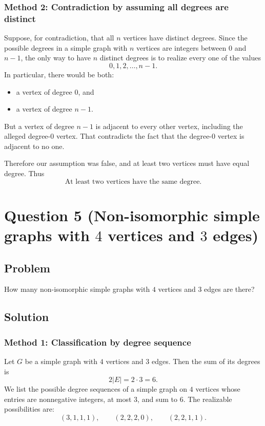 \documentclass[12pt]{article}
\begin{document}
\subsubsection{Method 2: Contradiction by assuming all degrees are distinct}
Suppose, for contradiction, that all \(n\) vertices have distinct degrees. Since the possible degrees in a simple graph with \(n\) vertices are integers between \(0\) and \(n-1\), the only way to have \(n\) distinct degrees is to realize every one of the values
\[
0,1,2,\dots,n-1.
\]
In particular, there would be both:
\begin{itemize}[leftmargin=*]
  \item a vertex of degree \(0\), and
  \item a vertex of degree \(n-1\).
\end{itemize}
But a vertex of degree \(n-1\) is adjacent to every other vertex, including the alleged degree-\(0\) vertex. That contradicts the fact that the degree-\(0\) vertex is adjacent to no one.

Therefore our assumption was false, and at least two vertices must have equal degree. Thus
\[
\boxed{\text{At least two vertices have the same degree.}}
\]

\newpage

\section{Question 5 (Non-isomorphic simple graphs with \(4\) vertices and \(3\) edges)}

\subsection{Problem}
How many non-isomorphic simple graphs with \(4\) vertices and \(3\) edges are there?

\subsection{Solution}

\subsubsection{Method 1: Classification by degree sequence}
Let \(G\) be a simple graph with \(4\) vertices and \(3\) edges. Then the sum of its degrees is
\[
2|E|=2\cdot 3=6.
\]
We list the possible degree sequences of a simple graph on \(4\) vertices whose entries are nonnegative integers, at most \(3\), and sum to \(6\). The realizable possibilities are:
\[
(3,1,1,1),\qquad (2,2,2,0),\qquad (2,2,1,1).
\]
\end{document}
